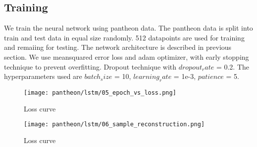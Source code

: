 \subsection{Training}
We train the neural network using pantheon data. The pantheon data is split into train and test data in equal size randomly. 512 datapoints are used for training and remaiing for testing. The network architecture is described in previous section. We use meansquared error loss and adam optimizer, with early stopping technique to prevent overfitting. Dropout technique with $dropout_rate$ = 0.2. The hyperparameters used are $batch_size$ = 10, $learning_rate$ = 1e-3, $patience$ = 5.
\begin{figure}[h]
	\centering
	\texttt{[image: pantheon/lstm/05\_epoch\_vs\_loss.png]}
	\caption{Loss curve}
	\label{fig:loss_curve}
\end{figure}
\begin{figure}[h]
	\centering
	\texttt{[image: pantheon/lstm/06\_sample\_reconstruction.png]}
	\caption{Loss curve}
	\label{fig:reconstruction}
\end{figure}